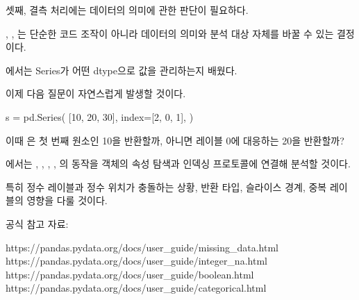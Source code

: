 셋째, 결측 처리에는 데이터의 의미에 관한 판단이 필요하다.

, , 는 단순한 코드 조작이 아니라 데이터의 의미와 분석 대상 자체를 바꿀 수 있는 결정이다.

에서는 Series가 어떤 dtype으로 값을 관리하는지 배웠다.

이제 다음 질문이 자연스럽게 발생할 것이다.

\begin{dhkcode}
s = pd.Series(
    [10, 20, 30],
    index=[2, 0, 1],
)
\end{dhkcode}

이때 은 첫 번째 원소인 10을 반환할까, 아니면 레이블 0에 대응하는 20을 반환할까?

에서는 \zsh{[]}, , , , 의 동작을 객체의 속성 탐색과 인덱싱 프로토콜에 연결해 분석할 것이다.

특히 정수 레이블과 정수 위치가 충돌하는 상황, 반환 타입, 슬라이스 경계, 중복 레이블의 영향을 다룰 것이다.

공식 참고 자료:

\begin{dhksmry}
https://pandas.pydata.org/docs/user_guide/missing_data.html
https://pandas.pydata.org/docs/user_guide/integer_na.html
https://pandas.pydata.org/docs/user_guide/boolean.html
https://pandas.pydata.org/docs/user_guide/categorical.html
\end{dhksmry}
